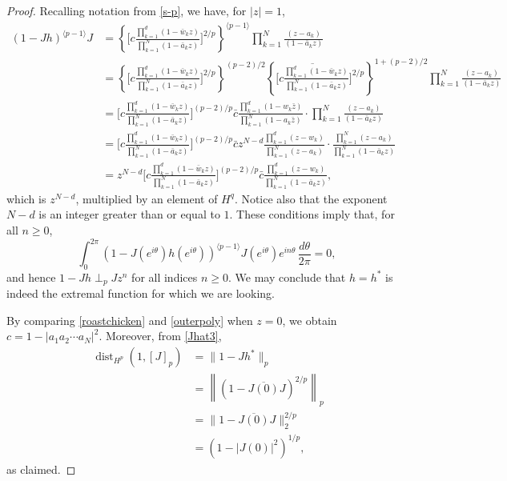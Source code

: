 \documentclass{article}
\theoremstyle{plain}
\numberwithin{Theorem}{section}
\numberwithin{equation}{section}
\theoremstyle{plain}
\theoremstyle{definition}
\renewcommand{\geq}{\geqslant}
\begin{document}
\begin{proof}
Recalling notation from \eqref{s-p}, we have, for $|z|=1$,
 \begin{align}
     (1- J h)^{\langle p-1 \rangle}J &=  \left\{ \Bigg[ c\frac{\prod_{k=1}^{d}(1 - \bar{w}_k z)}{\prod_{k=1}^{N}(1 - \bar{a}_k z)}\Bigg]^{2/p}\right\}^{\langle p-1 \rangle} \prod_{k=1}^{N}\frac{(z - a_k) }{ (1-\bar{a}_k z) } \nonumber \\
    &=  \left\{ \Bigg[ c\frac{\prod_{k=1}^{d}(1 - \bar{w}_k z)}{\prod_{k=1}^{N}(1 - \bar{a}_k z)}\Bigg]^{2/p}\right\}^{(p-2)/2} 
     \left\{\overline{ \Bigg[ c\frac{\prod_{k=1}^{d}(1 - \bar{w}_k z)}{\prod_{k=1}^{N}(1 - \bar{a}_k z)} } \Bigg]^{2/p}\right\}^{1+(p-2)/2}
     \prod_{k=1}^{N}\frac{(z - a_k) }{ (1-\bar{a}_k z) } \nonumber \\
     &=   \Bigg[ c\frac{\prod_{k=1}^{d}(1 - \bar{w}_k z)}{\prod_{k=1}^{N}(1 - \bar{a}_k z)}\Bigg]^{(p-2)/p}
      \bar{c}\frac{\prod_{k=1}^{d}(1 - {w}_k \bar{z})}{\prod_{k=1}^{N}(1 - {a}_k \bar{z})}
     \cdot\prod_{k=1}^{N}\frac{(z - a_k) }{ (1-\bar{a}_k z) }   \nonumber\\
     &=   \Bigg[ c\frac{\prod_{k=1}^{d}(1 - \bar{w}_k z)}{\prod_{k=1}^{N}(1 - \bar{a}_k z)}\Bigg]^{(p-2)/p} 
      \bar{c}z^{N-d} \frac{\prod_{k=1}^{d}(z - {w}_k )}{\prod_{k=1}^{N}(z - {a}_k)}
     \cdot\frac{ \prod_{k=1}^{N}(z - a_k) }{ \prod_{k=1}^{N}(1-\bar{a}_k z) } \nonumber \\
     &=  z^{N-d} \Bigg[ c\frac{\prod_{k=1}^{d}(1 - \bar{w}_k z)}{\prod_{k=1}^{N}(1 - \bar{a}_k z)}\Bigg]^{(p-2)/p}
      \bar{c} \frac{\prod_{k=1}^{d}(z - {w}_k )}{ \prod_{k=1}^{N}(1-\bar{a}_k z)}, \label{spicyham}
 \end{align}
 which is $z^{N-d}$, multiplied by an element of $H^q$.  Notice also that the exponent $N-d$ is an integer greater than or equal to $1$.  These conditions imply that, for all $n\geq 0$,
 \[
      \int_{0}^{2\pi} (1- J(e^{i\theta}) h(e^{i\theta}))^{\langle p-1 \rangle}J(e^{i\theta}) e^{in\theta}\,\frac{d\theta}{2\pi} = 0,\ 
 \]
 and hence $1-Jh \perp_p J z^n$ for all indices $n\geq 0$.  We may conclude that $h= h^*$ is indeed the extremal function for which we are looking. 
 
By comparing \eqref{roastchicken} and \eqref{outerpoly} when $z=0$, we obtain $c = 1 - |a_1 a_2 \cdots a_N|^2$.  
Moreover, from \eqref{Jhat3}, 
\begin{align*}
\operatorname{dist}_{H^p} (1, [J]_p) &= \| 1 - J h^*\|_p\\
&= \left\|\left( 1 - \overline{J(0)} J \right)^{2/p}\right\|_p \\
&=  \|  1 - \overline{J(0)} J  \|_2^{2/p} \\
&= \left(1 - |J(0)|^2 \right)^{1/p},
\end{align*}
as claimed. 
\end{proof}
\end{document}
